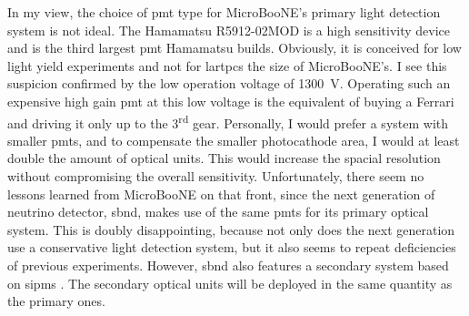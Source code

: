 In my view, the choice of \gls{pmt} type for MicroBooNE's primary light detection system is not ideal. The Hamamatsu R5912-02MOD is a high sensitivity device and is the third largest \gls{pmt} Hamamatsu builds. Obviously, it is conceived for low light yield experiments and not for \glspl{lartpc} the size of MicroBooNE's. I see this suspicion confirmed by the low operation voltage of \SI{1300}{\volt}. Operating such an expensive high gain \gls{pmt} at this low voltage is the equivalent of buying a Ferrari and driving it only up to the 3\textsuperscript{rd} gear. Personally, I would prefer a system with smaller \glspl{pmt}, and to compensate the smaller photocathode area, I would at least double the amount of optical units. This would increase the spacial resolution without compromising the overall sensitivity. Unfortunately, there seem no lessons learned from MicroBooNE on that front, since the next generation of neutrino detector, \gls{sbnd}, makes use of the same \glspl{pmt} for its primary optical system. This is doubly disappointing, because not only does the next generation use a conservative light detection system, but it also seems to repeat deficiencies of previous experiments. However, \gls{sbnd} also features a secondary system based on \glspl{sipm} \cite{SBNDLightReadoutSystem}. The secondary optical units will be deployed in the same quantity as the primary ones.


